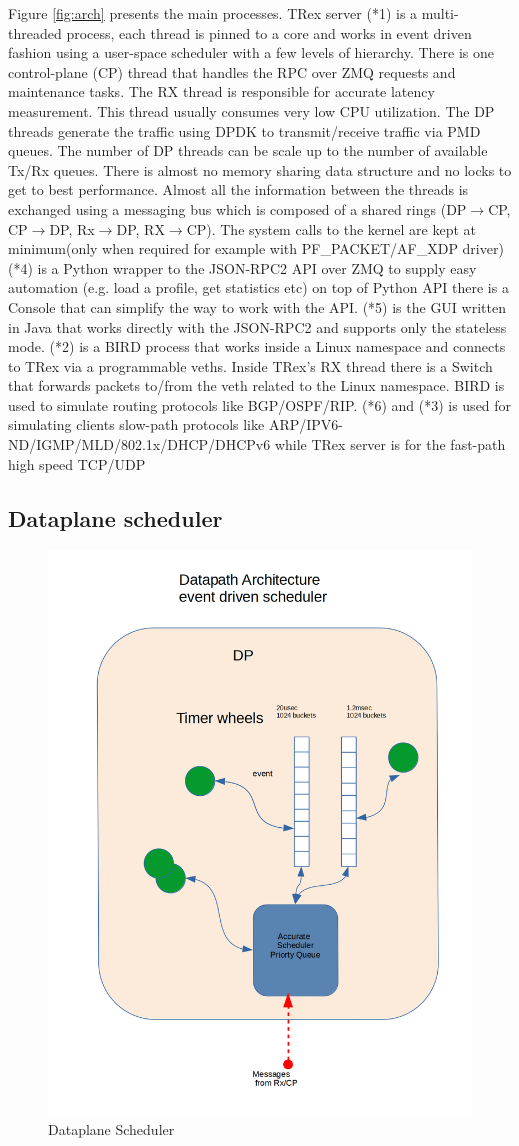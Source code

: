 \documentclass[conference]{IEEEtran}
\begin{document}
Figure \ref{fig:arch} presents the main processes. TRex server (*1) is a multi-threaded process, each thread is pinned to a core and works in 
event driven fashion using a user-space scheduler with a few levels of hierarchy. There is one control-plane (CP) thread that handles the RPC over ZMQ requests and maintenance tasks. 
The RX thread is responsible for accurate latency measurement. This thread usually consumes very low CPU utilization. 
The DP threads generate the traffic using DPDK to transmit/receive traffic via PMD queues. 
The number of DP threads can be scale up to the number of available Tx/Rx queues. 
There is almost no memory sharing data structure and no locks to get to best performance. 
Almost all the information between the threads is exchanged using a messaging bus which 
is composed of a shared rings (DP$\rightarrow$CP, CP$\rightarrow$DP, Rx$\rightarrow$DP, RX$\rightarrow$CP).
The system calls to the kernel are kept at minimum(only when required for example with PF\_PACKET/AF\_XDP driver)
(*4) is a Python wrapper to the JSON-RPC2 API over ZMQ to supply easy automation (e.g. load a profile, get statistics etc)
on top of Python API there is a Console that can simplify the way to work with the API. 
(*5) is the GUI written in Java that works directly with the JSON-RPC2 and supports only the stateless mode.
(*2) is a BIRD \cite{b4} process that works inside a Linux namespace and connects to TRex via a programmable veths. Inside TRex's RX thread there is a Switch that forwards packets to/from the veth related to the Linux namespace. 
BIRD is used to simulate routing protocols like BGP/OSPF/RIP.
(*6) and (*3) is used for simulating clients slow-path protocols like ARP/IPV6-ND/IGMP/MLD/802.1x/DHCP/DHCPv6 while TRex server is for the fast-path high speed TCP/UDP

\subsection{Dataplane scheduler}

\begin{figure}[h]
  \includegraphics[width=0.3
  \textwidth, center]{trex_dp_sheduler.png}
  \caption{Dataplane Scheduler}
  \label{fig:dp_schduler}
\end{figure}
  
\end{document}
